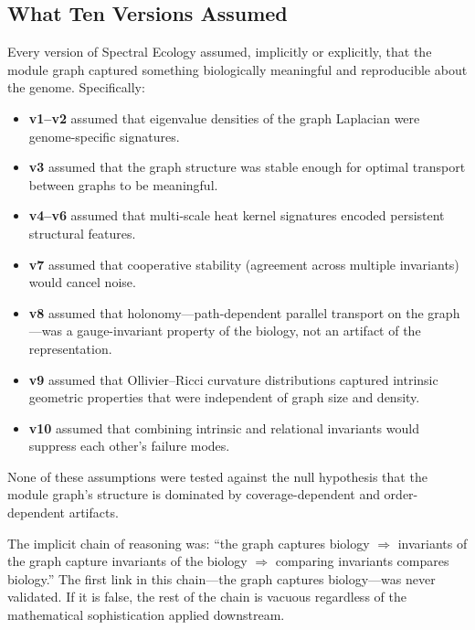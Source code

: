 \documentclass{../yalumba}
\begin{document}
\subsection{What Ten Versions Assumed}

Every version of Spectral Ecology assumed, implicitly or explicitly,
that the module graph captured something biologically meaningful and
reproducible about the genome.  Specifically:

\begin{itemize}
  \item \textbf{v1--v2} assumed that eigenvalue densities of the graph
    Laplacian were genome-specific signatures.
  \item \textbf{v3} assumed that the graph structure was stable enough
    for optimal transport between graphs to be meaningful.
  \item \textbf{v4--v6} assumed that multi-scale heat kernel signatures
    encoded persistent structural features.
  \item \textbf{v7} assumed that cooperative stability (agreement across
    multiple invariants) would cancel noise.
  \item \textbf{v8} assumed that holonomy---path-dependent parallel
    transport on the graph---was a gauge-invariant property of the
    biology, not an artifact of the representation.
  \item \textbf{v9} assumed that Ollivier--Ricci curvature distributions
    captured intrinsic geometric properties that were independent of
    graph size and density.
  \item \textbf{v10} assumed that combining intrinsic and relational
    invariants would suppress each other's failure modes.
\end{itemize}

None of these assumptions were tested against the null hypothesis that
the module graph's structure is dominated by coverage-dependent and
order-dependent artifacts.


The implicit chain of reasoning was: ``the graph captures biology
$\Rightarrow$ invariants of the graph capture invariants of the biology
$\Rightarrow$ comparing invariants compares biology.''  The first link
in this chain---the graph captures biology---was never validated.  If
it is false, the rest of the chain is vacuous regardless of the
mathematical sophistication applied downstream.
\end{document}
